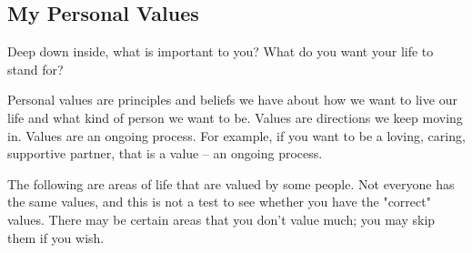 	\subsection{My Personal Values}
		Deep down inside, what is important to you? What do you want your life to stand for?  

		Personal values are principles and beliefs we have about how we want to live our life and what kind of person we want to be. Values are directions we keep moving in. Values are an ongoing process. For example, if you want to be a loving, caring, supportive partner, that is a value – an ongoing process.  


		The following are areas of life that are valued by some people. Not everyone has the same values, and this is not a test to see whether you have the "correct" values. There may be certain areas that you don’t value much; you may skip them if you wish. 

